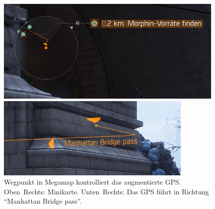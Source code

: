 \begin{figure}[p]
    \begin{minipage}{0.5\linewidth}
        \centering
        \vspace{0pt}
    \end{minipage}%
    \hfill
    \begin{minipage}{0.48\linewidth}
        \centering
        \vspace{0pt}
        \includegraphics[width=\linewidth]{figures/concept/the_division_minimap}
        
        \vspace{1em}
        \includegraphics[width=\linewidth]{figures/concept/the_division_arrow}
    \end{minipage}
    \caption{Wegpunkt in Megamap kontrolliert das augmentierte GPS. %
    Oben~Rechts: Minikarte. %
    Unten~Rechts: Das GPS führt in Richtung \enquote{Manhattan Bridge pass}.}
    \label{fig:tctd_ar-gps}
\end{figure}


